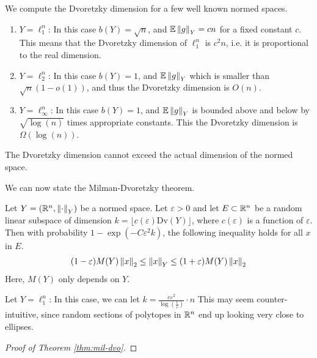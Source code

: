 \documentclass[11pt]{article}
\begin{document}
We compute the Dvoretzky dimension for a few well known normed spaces.
\begin{example}
  \begin{enumerate}[(1)]
  \item $Y = \ell_1^n$: In this case $b(Y) = \sqrt{n}$, and $\mathbb{E}\left\lVert g\right\rVert_Y = cn$ for a fixed constant $c$.
    This means that the Dvoretzky dimension of $\ell_1^n$ is $c^2n$, i.e. it is proportional to the real dimension.
  \item $Y = \ell_2^n$: In this case $b(Y) = 1$, and $\mathbb{E}\left\lVert g\right\rVert_Y$ which is smaller than $\sqrt{n}(1 - o(1))$, and thus the Dvoretzky dimension is $O(n)$.
  \item $Y = \ell_{\infty}^n$: In this case $b(Y) = 1$, and $\mathbb{E}\left\lVert g\right\rVert_Y$ is bounded above and below by $\sqrt{\log(n)}$ times appropriate constants.
    This the Dvoretzky dimension is $\Omega(\log(n))$.
  \end{enumerate}
\end{example}
\begin{fact}
  The Dvoretzky dimension cannot exceed the actual dimension of the normed space.
\end{fact}
We can now state the Milman-Dvoretzky theorem.
\begin{theorem}
  \label{thm:mil-dvo}
  Let $Y = \left( \mathbb{R}^n, \left\lVert\cdot\right\rVert_Y \right)$ be a normed space.
  Let $\varepsilon > 0$ and let $E \subset \mathbb{R}^n$ be a random linear subspace of dimension $k = \lfloor c(\varepsilon) \mathrm{Dv}(Y) \rfloor$, where $c(\varepsilon)$ is a function of $\varepsilon$.
  Then with probability $1 - \exp\left( -C \varepsilon^2 k \right)$, the following inequality holds for all $x$ in $E$.
  \begin{align*}
    (1-\varepsilon)M(Y)\left\lVert x\right\rVert_2 \leq \left\lVert x\right\rVert_Y \leq (1+\varepsilon)M(Y)\left\lVert x\right\rVert_2
  \end{align*}
  Here, $M(Y)$ only depends on $Y$.
\end{theorem}

\begin{example}
  \item Let $Y = \ell_1^n$: In this case, we can let $k = \frac{c \varepsilon^2}{\log\left( \frac{1}{\varepsilon} \right)} \cdot n$
    This may seem counter-intuitive, since random sections of polytopes in $\mathbb{R}^n$ end up looking very close to ellipses.
\end{example}

\begin{proof}[Proof of Theorem \ref{thm:mil-dvo}]

\end{proof}

\printbibliography
\end{document}
